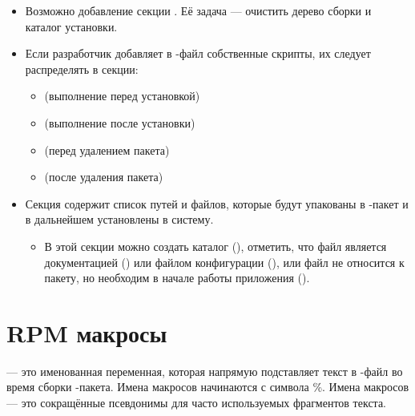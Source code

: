 \begin{itemize}
	\item Возможно добавление секции . Её задача --- очистить дерево сборки и каталог установки.
	
	\item Если разработчик добавляет в -файл собственные скрипты, их следует распределять в секции: 
	\begin{itemize}
		\item {} (выполнение перед установкой)
		\item {} (выполнение после установки)
		\item {} (перед удалением пакета)
		\item {} (после удаления пакета)
	\end{itemize}
	
	\item Секция  содержит список путей и файлов, которые будут упакованы в -пакет и в дальнейшем установлены в систему.
	\begin{itemize}
		\item В этой секции можно создать каталог (), отметить, что файл является документацией () или файлом конфигурации (), или файл не относится к пакету, но необходим в начале работы приложения ().
	\end{itemize} 
\end{itemize}


\section{RPM макросы}
 --- это именованная переменная, которая напрямую подставляет текст в -файл во время сборки -пакета. Имена макросов начинаются с символа \%. Имена макросов --- это сокращённые псевдонимы для часто используемых фрагментов текста. 
	

